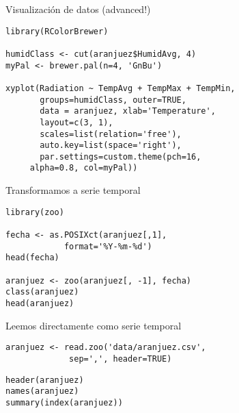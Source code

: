 \documentclass[xcolor={usenames,svgnames,dvipsnames}]{beamer}
\begin{document}
\begin{frame}[fragile,label=sec-1-4]{Visualización de datos (advanced!)}
 \lstset{language=R,numbers=none}
\begin{lstlisting}
library(RColorBrewer)

humidClass <- cut(aranjuez$HumidAvg, 4)
myPal <- brewer.pal(n=4, 'GnBu')

xyplot(Radiation ~ TempAvg + TempMax + TempMin,
       groups=humidClass, outer=TRUE,
       data = aranjuez, xlab='Temperature',
       layout=c(3, 1),
       scales=list(relation='free'),
       auto.key=list(space='right'),
       par.settings=custom.theme(pch=16,
	 alpha=0.8, col=myPal))
\end{lstlisting}
\end{frame}

\begin{frame}[fragile,label=sec-1-5]{Transformamos a serie temporal}
 \lstset{language=R,numbers=none}
\begin{lstlisting}
library(zoo)

fecha <- as.POSIXct(aranjuez[,1],
		    format='%Y-%m-%d')
head(fecha)

aranjuez <- zoo(aranjuez[, -1], fecha)
class(aranjuez)
head(aranjuez)
\end{lstlisting}
\end{frame}
\begin{frame}[fragile,label=sec-1-6]{Leemos directamente como serie temporal}
 \lstset{language=R,numbers=none}
\begin{lstlisting}
aranjuez <- read.zoo('data/aranjuez.csv',
		     sep=',', header=TRUE)
\end{lstlisting}

\lstset{language=R,numbers=none}
\begin{lstlisting}
header(aranjuez)
names(aranjuez)
summary(index(aranjuez))
\end{lstlisting}
\end{frame}
\end{document}
